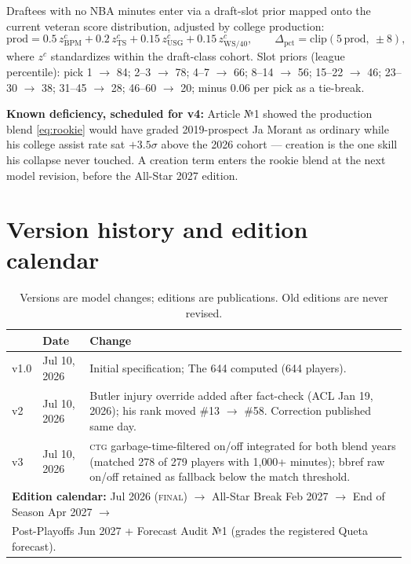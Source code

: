 \documentclass[11pt]{article}
\newcommand{\ctg}{\textsc{ctg}}
\begin{document}
Draftees with no NBA minutes enter via a draft-slot prior mapped onto the current
veteran score distribution, adjusted by college production:
\begin{equation}
\text{prod} = 0.5\, z^{c}_{\mathrm{BPM}} + 0.2\, z^{c}_{\mathrm{TS}}
+ 0.15\, z^{c}_{\mathrm{USG}} + 0.15\, z^{c}_{\mathrm{WS/40}},
\qquad
\Delta_{\text{pct}} = \mathrm{clip}(5\,\text{prod},\ \pm 8),
\label{eq:rookie}
\end{equation}
where $z^c$ standardizes within the draft-class cohort. Slot priors (league percentile):
pick 1 $\to$ 84; 2--3 $\to$ 78; 4--7 $\to$ 66; 8--14 $\to$ 56; 15--22 $\to$ 46;
23--30 $\to$ 38; 31--45 $\to$ 28; 46--60 $\to$ 20; minus $0.06$ per pick as a tie-break.

\textbf{Known deficiency, scheduled for v4:} Article №1 showed the production blend
\eqref{eq:rookie} would have graded 2019-prospect Ja Morant as ordinary while his college
assist rate sat $+3.5\sigma$ above the 2026 cohort --- creation is the one skill his
collapse never touched. A creation term enters the rookie blend at the next model
revision, before the All-Star 2027 edition.

\section{Version history and edition calendar}

\begin{table}[h]
\centering\small
\caption{Versions are model changes; editions are publications. Old editions are never
revised.}
\begin{tabular}{llp{8.6cm}}
\toprule
& Date & Change \\
\midrule
v1.0 & Jul 10, 2026 & Initial specification; The 644 computed (644 players). \\
v2 & Jul 10, 2026 & Butler injury override added after fact-check (ACL Jan 19, 2026);
his rank moved \#13 $\to$ \#58. Correction published same day. \\
v3 & Jul 10, 2026 & \ctg{} garbage-time-filtered on/off integrated for both blend years
(matched 278 of 279 players with 1{,}000+ minutes); bbref raw on/off retained as
fallback below the match threshold. \\
\midrule
\multicolumn{3}{l}{\textbf{Edition calendar:} Jul 2026 (\textsc{final}) $\to$
All-Star Break Feb 2027 $\to$ End of Season Apr 2027 $\to$} \\
\multicolumn{3}{l}{Post-Playoffs Jun 2027 + Forecast Audit №1 (grades the registered
Queta forecast).} \\
\bottomrule
\end{tabular}
\label{tab:versions}
\end{table}
\end{document}
